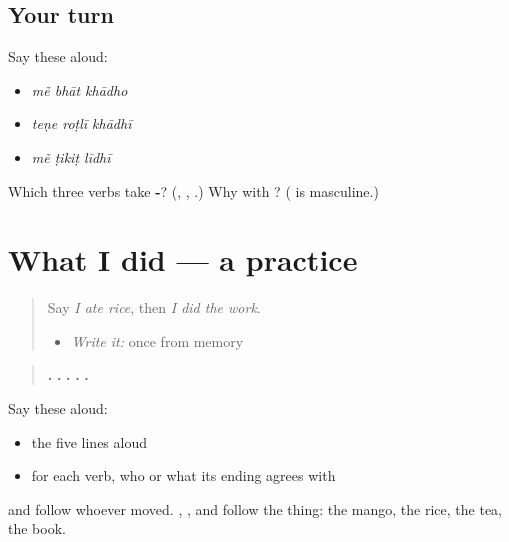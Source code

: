 \subsection*{Your turn}
Say these aloud:

\begin{itemize}
\raggedright
  \item \emph{mẽ bhāt khādho}
  \item \emph{teṇe roṭlī khādhī}
  \item \emph{mẽ ṭikiṭ līdhī}
\end{itemize}

\begin{tcolorbox}[breakable,colback=teal!4,colframe=teal!35!black,title={Before you move on}]
Which three verbs take \textbf{-}? (\textbf{}, \textbf{}, \textbf{}.) Why \textbf{} with \textbf{}? (\textbf{} is masculine.)
\end{tcolorbox}
\section[Practice]{What I did — a practice}

\label{lesson:GU-C148-did-practice}



\begin{quote}
Say \emph{I ate rice}, then \emph{I did the work}.

\begin{itemize}
\raggedright
  \item \emph{Write it:} \textbf{} once from memory
\end{itemize}
\end{quote}

\begin{tcolorbox}[breakable,skin=enhanced,colback=orange!6,colframe=orange!45!black,boxrule=0.5pt,arc=1mm,left=6pt,right=6pt,top=4pt,bottom=4pt,fonttitle=\bfseries,title={Read this}]
\begin{quote}
\textbf{   .} \textbf{  .} \textbf{   .} \textbf{     .} \textbf{   .}
\end{quote}

Say these aloud:

\begin{itemize}
\raggedright
  \item the five lines aloud
  \item for each verb, who or what its ending agrees with
\end{itemize}

\textbf{} and \textbf{} follow whoever moved. \textbf{}, \textbf{}, \textbf{} and \textbf{} follow the thing: the mango, the rice, the tea, the book.
\end{tcolorbox}

